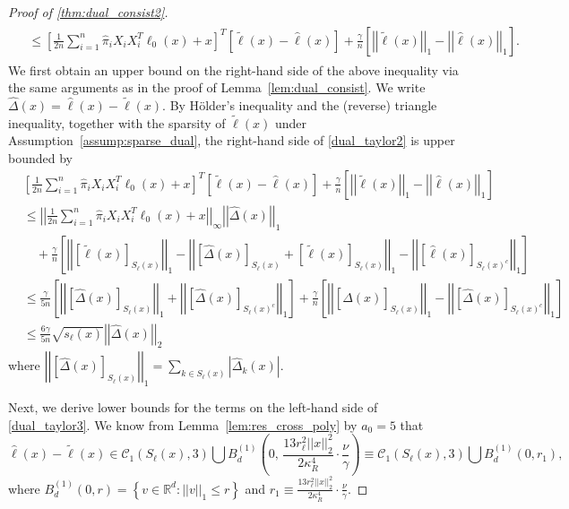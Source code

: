 \documentclass[ejsv2,noshowframe]{imsart}
\theoremstyle{plain}
\theoremstyle{definition}
\theoremstyle{remark}
\newcommand{\norm}[1]{\left|\left| #1 \right|\right|}
\renewcommand{\hat}{\widehat}
\renewcommand{\tilde}{\widetilde}
\begin{document}
\begin{proof}[Proof of \autoref{thm:dual_consist2}]
{\begin{align}
\begin{split}
			&\leq \left[\frac{1}{2n} \sum_{i=1}^n \hat{\pi}_i X_iX_i^T \ell_0(x) +x \right]^T \left[\tilde{\ell}(x) - \hat{\ell}(x) \right] + \frac{\gamma}{n}\left[\norm{\tilde{\ell}(x)}_1 - \norm{\hat{\ell}(x)}_1 \right].
		\end{split}
	\end{align}}%
	We first obtain an upper bound on the right-hand side of the above inequality via the same arguments as in the proof of Lemma~\ref{lem:dual_consist}. We write $\hat{\Delta}(x) = \hat{\ell}(x) - \tilde{\ell}(x)$. By H{\"o}lder's inequality and the (reverse) triangle inequality, together with the sparsity of $\tilde{\ell}(x)$ under Assumption~\ref{assump:sparse_dual}, the right-hand side of \eqref{dual_taylor2} is upper bounded by
	\begin{align*}
		&\left[\frac{1}{2n} \sum_{i=1}^n \hat{\pi}_i X_iX_i^T \ell_0(x) +x \right]^T \left[\tilde{\ell}(x) - \hat{\ell}(x) \right] + \frac{\gamma}{n}\left[\norm{\tilde{\ell}(x)}_1 - \norm{\hat{\ell}(x)}_1 \right] \\
		&\leq \norm{\frac{1}{2n} \sum_{i=1}^n \hat{\pi}_i X_iX_i^T \ell_0(x) +x}_{\infty} \norm{\hat{\Delta}(x)}_1 \\
		&\quad + \frac{\gamma}{n} \left[\norm{\left[\tilde{\ell}(x)\right]_{S_{\ell}(x)}}_1 - \norm{\left[\hat{\Delta}(x)\right]_{S_{\ell}(x)} + \left[\tilde{\ell}(x)\right]_{S_{\ell}(x)}}_1 - \norm{\left[\hat{\ell}(x)\right]_{S_{\ell}(x)^c}}_1\right]\\
		&\leq \frac{\gamma}{5n} \left[\norm{\left[\hat{\Delta}(x)\right]_{S_{\ell}(x)}}_1 + \norm{\left[\hat{\Delta}(x)\right]_{S_{\ell}(x)^c}}_1 \right] + \frac{\gamma}{n} \left[\norm{\left[\hat{\Delta}(x) \right]_{S_{\ell}(x)}}_1 - \norm{\left[\hat{\Delta}(x) \right]_{S_{\ell}(x)^c}}_1 \right]\\
		&\leq \frac{6\gamma}{5n} \sqrt{s_{\ell}(x)} \norm{\hat{\Delta}(x)}_2
	\end{align*}
	where $\norm{\left[\hat{\Delta}(x) \right]_{S_{\ell}(x)}}_1 = \sum_{k\in S_{\ell}(x)} \left|\hat{\Delta}_k(x) \right|$.
	
	Next, we derive lower bounds for the terms on the left-hand side of \eqref{dual_taylor3}. We know from Lemma~\ref{lem:res_cross_poly} by $a_0=5$ that 
	$$\hat{\ell}(x)-\tilde{\ell}(x) \in \mathcal{C}_1\left(S_{\ell}(x), 3 \right) \bigcup B_d^{(1)}\left(0,\, \frac{13 r_{\ell}^2 \norm{x}_2^2}{2 \kappa_R^4} \cdot \frac{\nu}{\gamma}\right) \equiv \mathcal{C}_1\left(S_{\ell}(x), 3 \right) \bigcup B_d^{(1)}(0,r_1),$$ 
	where $B_d^{(1)}(0,r) = \left\{v\in \mathbb{R}^d: \norm{v}_1 \leq r\right\}$ and $r_1 \equiv \frac{13 r_{\ell}^2 \norm{x}_2^2}{2 \kappa_R^4} \cdot \frac{\nu}{\gamma}$.
	

\end{proof}
\end{document}
